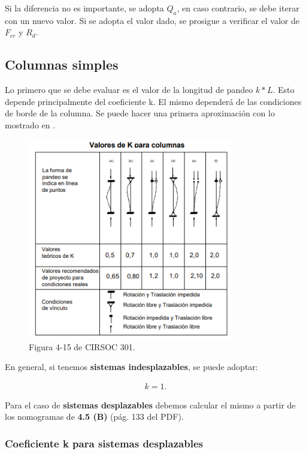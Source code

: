 \documentclass[../main.tex]{subfiles}
\begin{document}
Si la diferencia no es importante, se adopta $Q_a$, en caso contrario, se debe
iterar con un nuevo valor. Si se adopta el valor dado, se prosigue a verificar
el valor de $F_{cr}$ y $R_d$.

\subsection{Columnas simples}

Lo primero que se debe evaluar es el valor de la longitud de pandeo $k*L$. Esto
depende principalmente del coeficiente k. El mismo dependerá de las condiciones
de borde de la columna. Se puede hacer una primera aproximación con lo mostrado
en .

\begin{figure}[htpb]
  \centering
  \includegraphics[width=0.8\textwidth]{../images/resumen/k_aprox}
  \caption{Figura 4-15 de CIRSOC 301.}
  \label{fig:k_aprox}
\end{figure}
 
En general, si tenemos \textbf{sistemas indesplazables}, se puede adoptar:

\begin{align*}
  k = 1 \tag{para sistemas indesplazables}
.\end{align*}

Para el caso de \textbf{sistemas desplazables} debemos calcular el mismo a
partir de los nomogramas de \textbf{4.5 (B)} (pág. 133 del PDF).

\subsubsection{Coeficiente k para sistemas desplazables}
\end{document}
